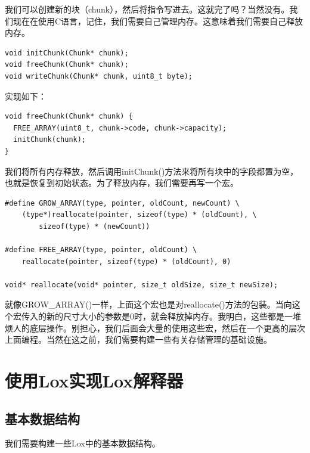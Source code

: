 \documentclass[cn,10pt,math=newtx,citestyle=gb7714-2015,bibstyle=gb7714-2015]{elegantbook}
\newenvironment{code}{\captionsetup{type=listing}}{}
\begin{document}
我们可以创建新的块（chunk），然后将指令写进去。这就完了吗？当然没有。我们现在在使用C语言，记住，我们需要自己管理内存。这意味着我们需要自己释放内存。

\begin{code}
\begin{verbatim}
void initChunk(Chunk* chunk);
void freeChunk(Chunk* chunk);
void writeChunk(Chunk* chunk, uint8_t byte);
\end{verbatim}
\end{code}

实现如下：

\begin{code}
\begin{verbatim}
void freeChunk(Chunk* chunk) {
  FREE_ARRAY(uint8_t, chunk->code, chunk->capacity);
  initChunk(chunk);
}
\end{verbatim}
\end{code}

我们将所有内存释放，然后调用initChunk()方法来将所有块中的字段都置为空，也就是恢复到初始状态。为了释放内存，我们需要再写一个宏。

\begin{code}
\begin{verbatim}
#define GROW_ARRAY(type, pointer, oldCount, newCount) \
    (type*)reallocate(pointer, sizeof(type) * (oldCount), \
        sizeof(type) * (newCount))

#define FREE_ARRAY(type, pointer, oldCount) \
    reallocate(pointer, sizeof(type) * (oldCount), 0)

void* reallocate(void* pointer, size_t oldSize, size_t newSize);
\end{verbatim}
\end{code}

就像GROW\_ARRAY()一样，上面这个宏也是对reallocate()方法的包装。当向这个宏传入的新的尺寸大小的参数是0时，就会释放掉内存。我明白，这些都是一堆烦人的底层操作。别担心，我们后面会大量的使用这些宏，然后在一个更高的层次上面编程。当然在这之前，我们需要构建一些有关存储管理的基础设施。

\part{使用Lox实现Lox解释器}

\chapter{基本数据结构}

我们需要构建一些Lox中的基本数据结构。
\end{document}
